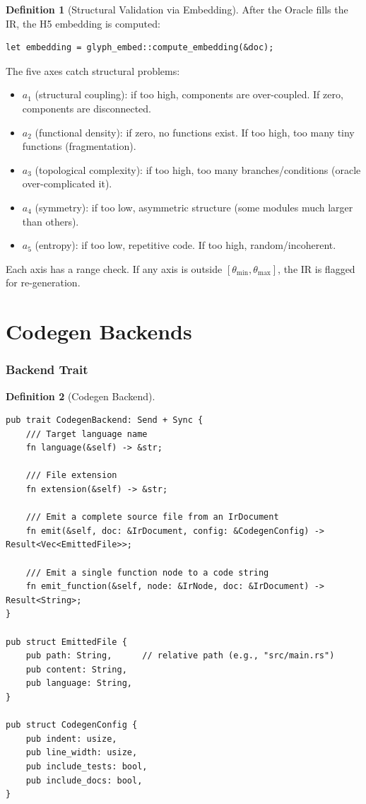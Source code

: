 \documentclass[11pt,a4paper,twoside]{article}
\theoremstyle{definition}
\newtheorem{definition}{Definition}[section]
\theoremstyle{plain}
\theoremstyle{remark}
\begin{document}
\begin{definition}[Structural Validation via Embedding]\label{def:h5val}
After the Oracle fills the IR, the H5 embedding is computed:
\begin{lstlisting}
let embedding = glyph_embed::compute_embedding(&doc);
\end{lstlisting}

The five axes catch structural problems:
\begin{itemize}[nosep]
  \item $a_1$ (structural coupling): if too high, components are
        over-coupled. If zero, components are disconnected.
  \item $a_2$ (functional density): if zero, no functions exist. If
        too high, too many tiny functions (fragmentation).
  \item $a_3$ (topological complexity): if too high, too many
        branches/conditions (oracle over-complicated it).
  \item $a_4$ (symmetry): if too low, asymmetric structure (some
        modules much larger than others).
  \item $a_5$ (entropy): if too low, repetitive code. If too high,
        random/incoherent.
\end{itemize}

Each axis has a range check. If any axis is outside $[\theta_{\min},
\theta_{\max}]$, the IR is flagged for re-generation.
\end{definition}


\part{Codegen Backends}\label{part:codegen}

\section{Backend Trait}\label{sec:backendtrait}

\begin{definition}[Codegen Backend]\label{def:backend}
\begin{lstlisting}
pub trait CodegenBackend: Send + Sync {
    /// Target language name
    fn language(&self) -> &str;

    /// File extension
    fn extension(&self) -> &str;

    /// Emit a complete source file from an IrDocument
    fn emit(&self, doc: &IrDocument, config: &CodegenConfig) -> Result<Vec<EmittedFile>>;

    /// Emit a single function node to a code string
    fn emit_function(&self, node: &IrNode, doc: &IrDocument) -> Result<String>;
}

pub struct EmittedFile {
    pub path: String,      // relative path (e.g., "src/main.rs")
    pub content: String,
    pub language: String,
}

pub struct CodegenConfig {
    pub indent: usize,
    pub line_width: usize,
    pub include_tests: bool,
    pub include_docs: bool,
}
\end{lstlisting}
\end{definition}
\end{document}
